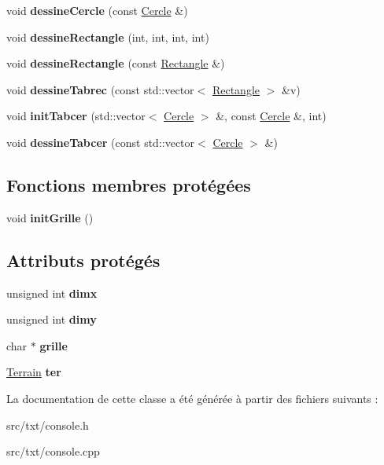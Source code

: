 \begin{DoxyCompactItemize}
void {\bfseries dessine\+Cercle} (const \mbox{\hyperlink{class_cercle}{Cercle}} \&)
\item 
\mbox{\label{classconsole_a172bd07fbcf46050e8cda6eab7647530}} 
void {\bfseries dessine\+Rectangle} (int, int, int, int)
\item 
\mbox{\label{classconsole_a26e4310238d20e7299ae1628426db97b}} 
void {\bfseries dessine\+Rectangle} (const \mbox{\hyperlink{class_rectangle}{Rectangle}} \&)
\item 
\mbox{\label{classconsole_a20be9f9f8fa84827c4a20283599f1fdf}} 
void {\bfseries dessine\+Tabrec} (const std\+::vector$<$ \mbox{\hyperlink{class_rectangle}{Rectangle}} $>$ \&v)
\item 
\mbox{\label{classconsole_a9d8aa81e8d9dd1c22e83b62b7a9b5ca9}} 
void {\bfseries init\+Tabcer} (std\+::vector$<$ \mbox{\hyperlink{class_cercle}{Cercle}} $>$ \&, const \mbox{\hyperlink{class_cercle}{Cercle}} \&, int)
\item 
\mbox{\label{classconsole_a153a8be6ea8ca7c8448393ea5669018d}} 
void {\bfseries dessine\+Tabcer} (const std\+::vector$<$ \mbox{\hyperlink{class_cercle}{Cercle}} $>$ \&)
\end{DoxyCompactItemize}
\subsection*{Fonctions membres protégées}
\begin{DoxyCompactItemize}
\item 
\mbox{\label{classconsole_a5454c97c279ac5913be7e55763737a16}} 
void {\bfseries init\+Grille} ()
\end{DoxyCompactItemize}
\subsection*{Attributs protégés}
\begin{DoxyCompactItemize}
\item 
\mbox{\label{classconsole_ac72551b7d07385fcf3772c2a240cabac}} 
unsigned int {\bfseries dimx}
\item 
\mbox{\label{classconsole_af0778fbb1b2e83607ba0f41b4c690ae4}} 
unsigned int {\bfseries dimy}
\item 
\mbox{\label{classconsole_acc96f54fd37c6e6ef5dca6c6d4fde2d5}} 
char $\ast$ {\bfseries grille}
\item 
\mbox{\label{classconsole_a6514f56e1902f9ceafb54c2dd361f32d}} 
\mbox{\hyperlink{class_terrain}{Terrain}} {\bfseries ter}
\end{DoxyCompactItemize}


La documentation de cette classe a été générée à partir des fichiers suivants \+:\begin{DoxyCompactItemize}
\item 
src/txt/console.\+h\item 
src/txt/console.\+cpp\end{DoxyCompactItemize}
